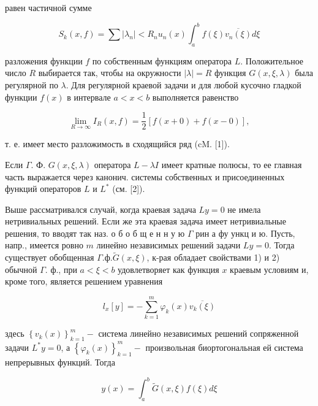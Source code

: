 \documentclass[10pt]{article}
\begin{document}
равен частичной сумме



\[

S_{k}(x, f)=\sum\left|\lambda_{n}\right|<R_{n} u_{n}(x) \int_{a}^{b} f(\xi) \overline{v_{n}(\xi)} d \xi

\]



разложения функции $f$ по собственным функциям оператора $L$. Положительное число $R$ выбирается так, чтобы на окружности $|\lambda|=R$ функция $G(x, \xi, \lambda)$ была регулярной по $\lambda$. Для регулярной краевой задачи и для любой кусочно гладкой функции $f(x)$ в интервале $a<x<b$ выполняется равенство



\[

\lim _{R \rightarrow \infty} I_{R}(x, f)=\frac{1}{2}[f(x+0)+f(x-0)],

\]



т. е. имеет место разложимость в сходящийся ряд (cM. [1]).



Если $\Gamma$. Ф. $G(x, \xi, \lambda)$ оператора $L-\lambda I$ имеет кратные полюсы, то ее главная часть выражается через канонич. системы собственных и присоединенных функций операторов $L$ и $L^{*}$ (см. [2]).



Выше рассматривался случай, когда краевая задача $L y=0$ не имела нетривиальных решений. Если же эта краевая задача имеет нетривиальные решения, то вводят так наз. о б о б щ е н н у ю $\Gamma$ рин а фу ункц и ю. Пусть, напр., имеется ровно $m$ линейно независимых решений задачи $L y=0$. Тогда существует обобщенная $\Gamma . ф . \tilde{G}(x, \xi)$, к-рая обладает свойствами 1) и 2) обычной $\Gamma$. ф., при $a<\xi<b$ удовлетворяет как функция $x$ краевым условиям и, кроме того, является решением уравнения



\[

l_{x}[y]=-\sum_{k=1}^{m} \varphi_{k}(x) \overline{v_{k}(\xi)}

\]



здесь $\left\{v_{k}(x)\right\}_{k=1}^{m}-$ система линейно независимых решений сопряженной задачи $L^{*} y=0$, а $\left\{\varphi_{k}(x)\right\}_{k=1}^{m}-$ произвольная биортогональная ей система непрерывных функций. Тогда



\[

y(x)=\int_{a}^{b} \tilde{G}(x, \xi) f(\xi) d \xi

\]
\end{document}
